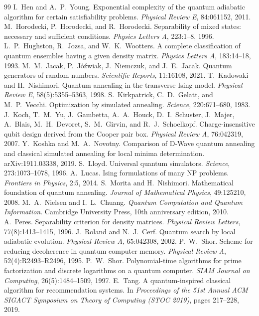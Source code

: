\begin{thebibliography}{99}
 I.~Hen and A.~P.~Young. Exponential complexity of the quantum adiabatic algorithm for certain satisfiability problems. \emph{Physical Review E}, 84:061152, 2011.
 M.~Horodecki, P.~Horodecki, and R.~Horodecki. Separability of mixed states: necessary and sufficient conditions. \emph{Physics Letters A}, 223:1--8, 1996.
 L.~P.~Hughston, R.~Jozsa, and W.~K.~Wootters. A complete classification of quantum ensembles having a given density matrix. \emph{Physics Letters A}, 183:14--18, 1993.
 M.~M.~Jacak, P.~Jóźwiak, J.~Niemczuk, and J.~E.~Jacak. Quantum generators of random numbers. \emph{Scientific Reports}, 11:16108, 2021.
 T.~Kadowaki and H.~Nishimori. Quantum annealing in the transverse Ising model. \emph{Physical Review E}, 58(5):5355--5363, 1998.
 S.~Kirkpatrick, C.~D.~Gelatt, and M.~P.~Vecchi. Optimization by simulated annealing. \emph{Science}, 220:671--680, 1983.
 J.~Koch, T.~M.~Yu, J.~Gambetta, A.~A.~Houck, D.~I.~Schuster, J.~Majer, A.~Blais, M.~H.~Devoret, S.~M.~Girvin, and R.~J.~Schoelkopf. Charge-insensitive qubit design derived from the Cooper pair box. \emph{Physical Review A}, 76:042319, 2007.
 Y.~Koshka and M.~A.~Novotny. Comparison of D-Wave quantum annealing and classical simulated annealing for local minima determination. arXiv:1911.03338, 2019.
 S.~Lloyd. Universal quantum simulators. \emph{Science}, 273:1073--1078, 1996.
 A.~Lucas. Ising formulations of many NP problems. \emph{Frontiers in Physics}, 2:5, 2014.
 S.~Morita and H.~Nishimori. Mathematical foundation of quantum annealing. \emph{Journal of Mathematical Physics}, 49:125210, 2008.
 M.~A.~Nielsen and I.~L.~Chuang. \emph{Quantum Computation and Quantum Information}. Cambridge University Press, 10th anniversary edition, 2010.
 A.~Peres. Separability criterion for density matrices. \emph{Physical Review Letters}, 77(8):1413--1415, 1996.
 J.~Roland and N.~J.~Cerf. Quantum search by local adiabatic evolution. \emph{Physical Review A}, 65:042308, 2002.
 P.~W.~Shor. Scheme for reducing decoherence in quantum computer memory. \emph{Physical Review A}, 52(4):R2493--R2496, 1995.
 P.~W.~Shor. Polynomial-time algorithms for prime factorization and discrete logarithms on a quantum computer. \emph{SIAM Journal on Computing}, 26(5):1484--1509, 1997.
 E.~Tang. A quantum-inspired classical algorithm for recommendation systems. In \emph{Proceedings of the 51st Annual ACM SIGACT Symposium on Theory of Computing (STOC 2019)}, pages 217--228, 2019.

\end{thebibliography}
